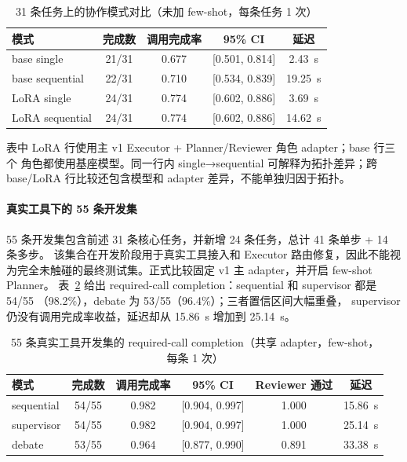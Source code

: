 \documentclass[UTF8,a4paper,12pt]{ctexart}
\begin{document}
\begin{table}[H]
  \centering
  \small
  \caption{31 条任务上的协作模式对比（未加 few-shot，每条任务 1 次）}
  \label{tab:modes}
  \begin{tabular}{lcccc}
    \toprule
    模式 & 完成数 & 调用完成率 & 95\% CI & 延迟 \\
    \midrule
    base single & 21/31 & 0.677 & [0.501, 0.814] & 2.43~s \\
    base sequential & 22/31 & 0.710 & [0.534, 0.839] & 19.25~s \\
    LoRA single & 24/31 & 0.774 & [0.602, 0.886] & 3.69~s \\
    LoRA sequential & 24/31 & 0.774 & [0.602, 0.886] & 14.62~s \\
    \bottomrule
  \end{tabular}
\end{table}

表中 LoRA 行使用主 v1 Executor + Planner/Reviewer 角色 adapter；base 行三个
角色都使用基座模型。同一行内 single→sequential 可解释为拓扑差异；跨
base/LoRA 行比较还包含模型和 adapter 差异，不能单独归因于拓扑。

\paragraph{真实工具下的 55 条开发集}
55 条开发集包含前述 31 条核心任务，并新增 24 条任务，总计 41 条单步 + 14 条多步。
该集合在开发阶段用于真实工具接入和 Executor 路由修复，因此不能视为完全未触碰的最终测试集。正式比较固定 v1 主 adapter，并开启 few-shot Planner。
表~\ref{tab:system55} 给出 required-call completion：sequential 和 supervisor 都是 54/55
（98.2\%），debate 为 53/55（96.4\%）；三者置信区间大幅重叠，
supervisor 仍没有调用完成率收益，延迟却从 15.86~s 增加到 25.14~s。

\begin{table}[H]
  \centering
  \small
  \caption{55 条真实工具开发集的 required-call completion（共享 adapter，few-shot，每条 1 次）}
  \label{tab:system55}
  \begin{tabular}{lccccc}
    \toprule
    模式 & 完成数 & 调用完成率 & 95\% CI & Reviewer 通过 & 延迟 \\
    \midrule
    sequential & 54/55 & 0.982 & [0.904, 0.997] & 1.000 & 15.86~s \\
    supervisor & 54/55 & 0.982 & [0.904, 0.997] & 1.000 & 25.14~s \\
    debate & 53/55 & 0.964 & [0.877, 0.990] & 0.891 & 33.38~s \\
    \bottomrule
  \end{tabular}
\end{table}
\end{document}
